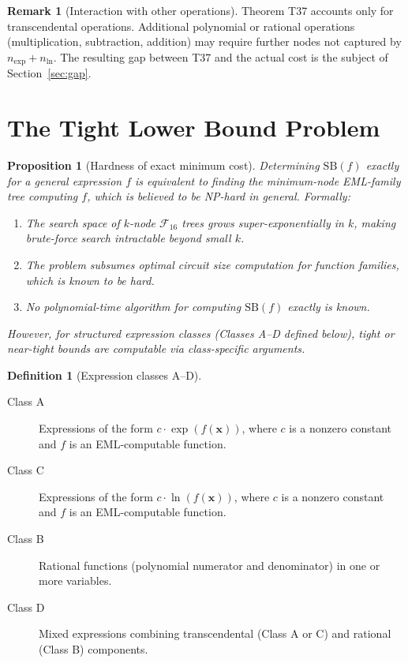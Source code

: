 \documentclass[12pt,a4paper]{article}
\newtheorem{proposition}[theorem]{Proposition}
\theoremstyle{definition}
\newtheorem{definition}[theorem]{Definition}
\newtheorem{remark}[theorem]{Remark}
\newcommand{\SB}{\mathrm{SB}}
\newcommand{\Fam}{\mathcal{F}}
\begin{document}
\begin{remark}[Interaction with other operations]\label{rem:interaction}
Theorem T37 accounts only for transcendental operations.  Additional polynomial
or rational operations (multiplication, subtraction, addition) may require
further nodes not captured by $n_{\exp} + n_{\ln}$.  The resulting gap between
T37 and the actual cost is the subject of Section~\ref{sec:gap}.
\end{remark}

\section{The Tight Lower Bound Problem}

\begin{proposition}[Hardness of exact minimum cost]\label{prop:hard}
Determining $\SB(f)$ exactly for a general expression $f$ is equivalent to
finding the minimum-node EML-family tree computing $f$, which is believed to
be NP-hard in general.  Formally:
\begin{enumerate}
  \item The search space of $k$-node $\Fam_{16}$ trees grows super-exponentially
        in $k$, making brute-force search intractable beyond small $k$.
  \item The problem subsumes optimal circuit size computation for function
        families, which is known to be hard.
  \item No polynomial-time algorithm for computing $\SB(f)$ exactly is known.
\end{enumerate}
However, for \emph{structured expression classes} (Classes A--D defined below),
tight or near-tight bounds are computable via class-specific arguments.
\end{proposition}

\begin{definition}[Expression classes A--D]\label{def:classes}
~
\begin{description}
  \item[Class A] Expressions of the form $c \cdot \exp(f(\mathbf{x}))$,
        where $c$ is a nonzero constant and $f$ is an EML-computable function.
  \item[Class C] Expressions of the form $c \cdot \ln(f(\mathbf{x}))$,
        where $c$ is a nonzero constant and $f$ is an EML-computable function.
  \item[Class B] Rational functions (polynomial numerator and denominator) in
        one or more variables.
  \item[Class D] Mixed expressions combining transcendental (Class A or C)
        and rational (Class B) components.
\end{description}
\end{definition}
\end{document}
